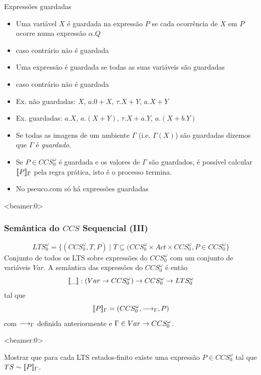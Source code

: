\documentclass[aspectratio=169]{beamer}
\begin{document}
\begin{frame}{Expressões guardadas}
\begin{itemize}[<+->]
	\item Uma variável $X$ é \alert{guardada} na expressão $P$ se cada ocorrência de $X$ em $P$ ocorre numa expressão $\alpha.Q$
\item caso contrário \alert{não é guardada}
\item Uma expressão é guardada se todas as suas  variáveis são guardadas
\item caso contrário \alert{não é guardada}
\item Ex. não guardadas: $X$, $a.0+X$, $\tau.X+Y$, $a.X+Y$
\item  Ex. guardadas: $a.X$, $a.(X+Y)$, $\tau.X +a.Y$, $a.(X+b.Y)$
\item Se todas as imagens de um ambiente $\Gamma$  (i.e. $\Gamma(X)$) são guardadas dizemos que $\Gamma$ é \emph{guardado}.
\item Se $P\in CCS_0^\omega$ é  guardada  e os valores de $\Gamma$ são guardados, é possível calcular $[\![ P ]\!]_\Gamma$ pela regra prática, isto é o processo termina.
\item No pseuco.com só há expressões guardadas
\end{itemize}
\end{frame}

\begin{frame}<beamer:0>
\frametitle{Semântica do $CCS$ Sequencial (III)}
$$LTS_0^\omega = \{(CCS_0^\omega,T,P)\mid T\subseteq (CCS_0^\omega\times Act\times CCS_0^\omega, P\in CCS_0^\omega\}$$
Conjunto de todos os LTS sobre expressões do $CCS_0^\omega$ com um conjunto de variáveis $Var$. A semântica das expressões do $CCS_0^\omega$ é então $$[\![ \_ ]\!]: (Var\rightarrow CCS_0^\omega) \rightarrow CCS_0^\omega \rightarrow LTS_0^\omega$$ tal que $$[\![ P ]\!]_\Gamma=(CCS_0^\omega,\longrightarrow_\Gamma,P)$$ com $\longrightarrow_\Gamma$ definida anteriormente e $\Gamma\in Var\rightarrow CCS_0^\omega$.
\end{frame}
\begin{frame}<beamer:0>
	\begin{exerc}
		Mostrar que para cada LTS estados-finito existe uma expressão $P\in CCS_0^\omega$ tal que $TS \sim [\![ P ]\!]_\Gamma$.
	\end{exerc}

\end{frame}

\begin{frame}
	\begin{exem}
		
	\end{exem}

\end{frame}
\end{document}
